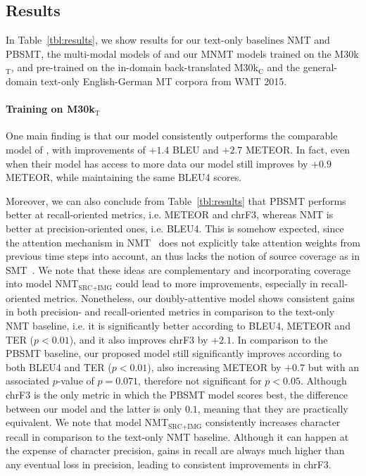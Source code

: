 \documentclass[11pt]{article}
\begin{document}
\subsection{Results}
\label{sec:results}

In Table~\ref{tbl:results}, we show results for our text-only baselines NMT and PBSMT, the multi-modal models of  and our MNMT models trained on the M30k$_\text{T}$, and pre-trained on the in-domain back-translated M30k$_\text{C}$ and the general-domain text-only English-German MT corpora from WMT 2015.


\paragraph{Training on M30k$_\text{T}$}

One main finding is that our model consistently outperforms the comparable model of , with improvements of $+1.4$ BLEU and $+2.7$ METEOR.
In fact, even when their model has access to more data our model still improves by $+0.9$ METEOR, while maintaining the same BLEU4 scores.

Moreover, we can also conclude from Table~\ref{tbl:results} that PBSMT performs better at recall-oriented metrics, i.e. METEOR and chrF3, whereas NMT is better at precision-oriented ones, i.e. BLEU4.
This is somehow expected, since the attention mechanism in NMT~\cite{BahdanauChoBengio2015} does not explicitly take attention weights from previous time steps into account, an thus lacks the notion of source coverage as in SMT~\cite{Koehnetal2003,Tuetal2016}.
We note that these ideas are complementary and incorporating coverage into model NMT$_{\text{SRC+IMG}}$ could lead to more improvements, especially in recall-oriented metrics.
Nonetheless, our doubly-attentive model shows consistent gains in both precision- and recall-oriented metrics in comparison to the text-only NMT baseline, i.e. it is significantly better according to BLEU4, METEOR and TER ($p<0.01$), and it also improves chrF3 by $+2.1$.
In comparison to the PBSMT baseline, our proposed model still significantly improves according to both BLEU4 and TER ($p<0.01$), also increasing METEOR by $+0.7$ but with an associated $p$-value of $p=0.071$, therefore not significant for $p<0.05$.
Although chrF3 is the only metric in which the PBSMT model scores best, the difference between our model and the latter is only $0.1$, meaning that they are practically equivalent.
We note that model NMT$_{\text{SRC+IMG}}$ consistently increases character recall in comparison to the text-only NMT baseline.
Although it can happen at the expense of character precision, gains in recall are always much higher than any eventual loss in precision, leading to consistent improvements in chrF3.
\end{document}

